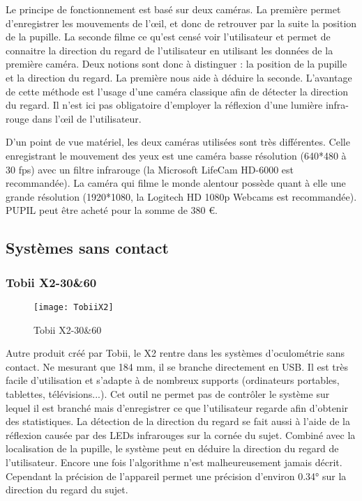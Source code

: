 Le principe de fonctionnement est basé sur deux caméras. La première permet d’enregistrer les mouvements de l’œil, et donc de retrouver par la suite la position de la pupille. La seconde filme ce qu’est censé voir l’utilisateur et permet de connaitre la direction du regard de l’utilisateur en utilisant les données de la première caméra.
Deux notions sont donc à distinguer : la position de la pupille et la direction du regard. La première nous aide à déduire la seconde. L’avantage de cette méthode est l’usage d'une caméra classique afin de détecter la direction du regard. Il n’est ici pas obligatoire d’employer la réflexion d’une lumière infra-rouge dans l’œil de l’utilisateur.

D’un point de vue matériel, les deux caméras utilisées sont très différentes.
Celle enregistrant le mouvement des yeux est une caméra basse résolution (640*480 à 30 fps) avec un filtre infrarouge (la  Microsoft LifeCam HD-6000 est recommandée). La caméra qui filme le monde alentour possède quant à elle une grande résolution (1920*1080, la Logitech HD 1080p Webcams est recommandée).
PUPIL peut être acheté pour la somme de 380 \euro{}.

\subsection{Systèmes sans contact}

\subsubsection{Tobii X2-30\&60}

\begin{figure}[h]
  \centering
  \texttt{[image: TobiiX2]}
  \caption{Tobii X2-30\&60}
  \label{fig:TobiiX2}
\end{figure}

Autre produit créé par Tobii, le X2 \cite{tobiieyetracker} rentre dans les systèmes d’oculométrie sans contact. Ne mesurant que 184 mm, il se branche directement en USB. Il est très facile d’utilisation et s'adapte à de nombreux supports (ordinateurs portables, tablettes, télévisions...).
Cet outil ne permet pas de contrôler le système sur lequel il est branché mais d’enregistrer ce que l’utilisateur regarde afin d’obtenir des statistiques.
La détection de la direction du regard se fait aussi à l’aide de la réflexion causée par des LEDs infrarouges sur la cornée du sujet. Combiné avec la localisation de la pupille, le système peut en déduire la direction du regard de l’utilisateur. Encore une fois l’algorithme n’est malheureusement jamais décrit. Cependant la précision de l’appareil permet une précision d’environ 0.34° sur la direction du regard du sujet. 

